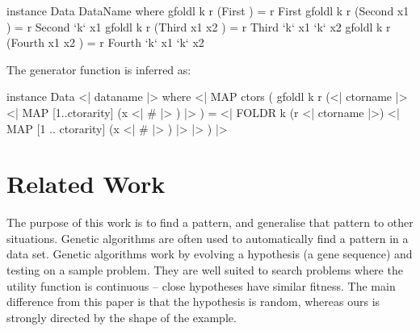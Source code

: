 \documentclass{llncs}
\begin{document}
\begin{code}
instance Data DataName where
    gfoldl k r (First          ) = r First
    gfoldl k r (Second  x1     ) = r Second  `k` x1
    gfoldl k r (Third   x1 x2  ) = r Third   `k` x1 `k` x2
    gfoldl k r (Fourth  x1 x2  ) = r Fourth  `k` x1 `k` x2
\end{code}

\noindent The generator function is inferred as:

\begin{code}
instance Data \? <| dataname |> where
    <| MAP ctors (
        gfoldl k r
            (<| ctorname |> \? <| MAP [1..ctorarity] (x <| # |> ) |> ) =
            <| FOLDR k (r \? <| ctorname |>)
                <| MAP [1 .. ctorarity] (x <| # |> ) |>
            |>
    ) |>
\end{code}


\begin{comment}

\subsection{The Serial class}

The |Serial| class is used by SmallCheck \cite{smallcheck} to automatically perform enumerative testing. The definition relies on the arities of each constructor, and does not induct over the components of a constructor.

\begin{code}
instance Serial alpha => Serial (DataName alpha) where
    series = cons0 First \/ cons1 Second \/ cons2 Third \/ cons2 Fourth
\end{code}

\end{comment}

\section{Related Work}
\label{sec:related}

The purpose of this work is to find a pattern, and generalise that pattern to other situations. Genetic algorithms \cite{genetic_algorithms} are often used to automatically find a pattern in a data set. Genetic algorithms work by evolving a hypothesis (a gene sequence) and testing on a sample problem. They are well suited to search problems where the utility function is continuous -- close hypotheses have similar fitness. The main difference from this paper is that the hypothesis is random, whereas ours is strongly directed by the shape of the example.
\end{document}
